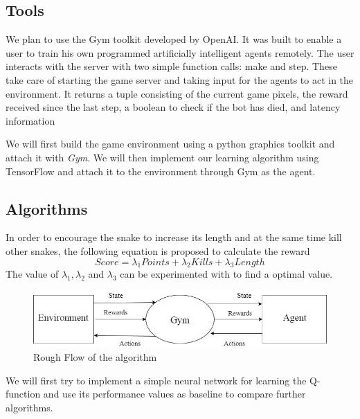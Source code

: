 \documentclass[conference]{IEEEtran}
\begin{document}
\subsection{Tools}
We plan to use the Gym toolkit developed by OpenAI\cite{n1}. It was built to
enable a user to train his own programmed artificially intelligent agents
remotely. The user interacts with the server with two simple function calls:
make and step. These take care of starting the game server and taking input
for the agents to act in the environment. It returns a tuple consisting of the
current game pixels, the reward received since the last step, a boolean to
check if the bot has died, and latency information
\newline\par
We will first build the game environment using a python graphics toolkit
and attach it with \textit{Gym}. We will then implement our learning algorithm
using TensorFlow\cite{n2} and attach it to the environment through Gym as
the agent. \newline\par

\subsection{Algorithms}
In order to encourage the snake to increase its length and at the same time kill other snakes, the following equation is proposed to calculate the reward
\begin{equation}
Score=\lambda_1 Points+ \lambda_2 Kills+\lambda_3Length
\end{equation}
The value of \({\lambda_1,\lambda_2}\) and \({\lambda_3}\) can be experimented with to find a optimal value.


\begin{figure}[h]
	
	\includegraphics[width=\linewidth]{flow.jpg}
	\caption{Rough Flow of the algorithm}

\end{figure}
We will first try to implement a simple neural network for learning the
Q-function and use its performance values as baseline to compare further algorithms.  \newline\par
\end{document}
